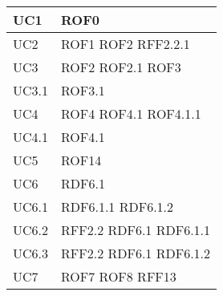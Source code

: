 \documentclass[../AnalisideiRequisiti.tex]{subfiles}
\begin{document}
\begin{longtable}{| p{4cm} | p{4cm} |}
	\hline
		\newline UC1 &  \newline ROF0 \\[1em]
	\hline
		\newline UC2 &  \newline ROF1 \newline ROF2 \newline RFF2.2.1   \\[1em]	
		\hline
		\newline UC3 &  \newline ROF2 \newline ROF2.1 \newline ROF3 \\[1em]	
		\hline
		\newline UC3.1 &  \newline ROF3.1 \\[1em]	
		\hline
		\newline UC4 &  \newline ROF4 \newline ROF4.1 \newline ROF4.1.1 \\[1em]
		\hline
		\newline UC4.1 &  \newline ROF4.1 \\[1em]
		\hline
		\newline UC5 &  \newline ROF14 \\[1em]
		\hline
		\newline UC6 &  \newline RDF6.1 \\[1em]
		\hline
		\newline UC6.1 &  \newline RDF6.1.1 \newline RDF6.1.2 \\[1em]
		\hline
		\newline UC6.2 &  \newline RFF2.2 \newline RDF6.1 \newline RDF6.1.1 \\[1em]
		\hline
		\newline UC6.3 &  \newline RFF2.2 \newline RDF6.1 \newline RDF6.1.2 \\[1em]
		\hline
		\newline UC7 &  \newline ROF7 \newline ROF8 \newline RFF13 \\[1em]

\end{longtable}
\end{document}
